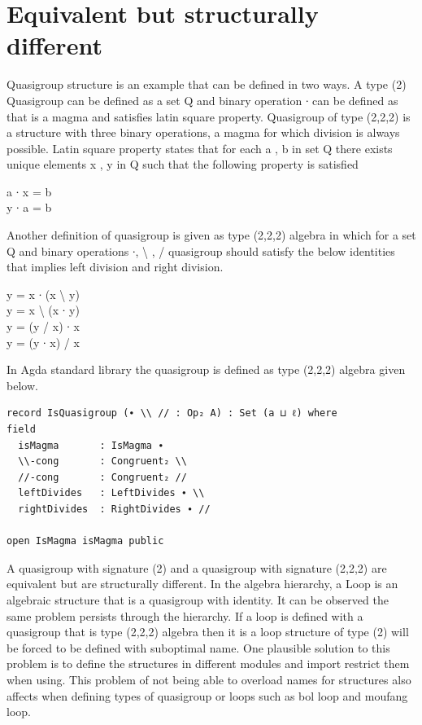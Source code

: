 \section{Equivalent but structurally different}
Quasigroup structure is an example that can be defined in two ways. A type (2)
Quasigroup can be defined as a set Q and binary operation ∙ can be defined as
that is a magma and satisfies latin square property. Quasigroup of type (2,2,2)
is a structure with three binary operations, a magma for which division is
always possible. Latin square property states that for each a , b in set Q there
exists unique elements x , y in Q such that the following property is satisfied
\citep{quasigroupWiki}\\
\begin{center}
a ∙ x = b\\
y ∙ a = b \\
\end{center}
Another definition of quasigroup is given as type (2,2,2) algebra in which for a
set Q and binary operations ∙, \textbackslash{} , / quasigroup should satisfy
the below identities that implies left division and right division. 
\begin{center}
y = x ∙ (x \textbackslash{} y)\\
y = x \textbackslash{} (x ∙ y)\\
y = (y / x) ∙ x\\
y = (y ∙ x) / x\\
\end{center}
In Agda standard library the quasigroup is defined as type (2,2,2) algebra given
below.\\

\begin{verbatim}
record IsQuasigroup (∙ \\ // : Op₂ A) : Set (a ⊔ ℓ) where
field
  isMagma       : IsMagma ∙
  \\-cong       : Congruent₂ \\
  //-cong       : Congruent₂ //
  leftDivides   : LeftDivides ∙ \\
  rightDivides  : RightDivides ∙ //

open IsMagma isMagma public
\end{verbatim}

A quasigroup with signature (2) and a quasigroup with signature (2,2,2) are
equivalent but are structurally different.  In the algebra hierarchy, a Loop is
an algebraic structure that is a quasigroup with identity. It can be observed
the same problem persists through the hierarchy. If a loop is defined with a
quasigroup that is type (2,2,2) algebra then it is a loop structure of type (2)
will be forced to be defined with suboptimal name. One plausible solution to
this problem is to define the structures in different modules and import
restrict them when using. This problem of not being able to overload names for
structures also affects when defining types of quasigroup or loops such as bol
loop and moufang loop.

